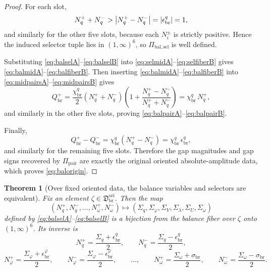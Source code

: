 \documentclass[11pt]{article}
\newcommand{\OriginSector}{\mathfrak D_{\mathrm{br}}^{\mathrm{ori}}}
\newcommand{\AbsReadAmp}{\chi_{\mathrm{br}}^{q}}
\newcommand{\PolRead}{\epsilon_{\mathrm{br}}^{q}}
\newcommand{\PolCov}{\epsilon_{\mathrm{br}}^{\varphi}}
\newcommand{\PolScale}{\sigma_{\mathrm{br}}}
\newcommand{\PairMap}{\Pi_{\mathrm{pair}}}
\newcommand{\PairReadPlus}{Q_{\mathrm{br}}^{+}}
\newcommand{\PairReadMinus}{Q_{\mathrm{br}}^{-}}
\newcommand{\SelRead}{\Sigma_{q}}
\newcommand{\SelCov}{\Sigma_{\varphi}}
\newcommand{\SelRelax}{\Sigma_{V}}
\newcommand{\SelWell}{\Sigma_{\lambda}}
\newcommand{\SelEq}{\Sigma_{U}}
\newcommand{\SelScale}{\Sigma_{\omega}}
\newcommand{\BalSelMap}{\Pi_{\mathrm{bal,sel}}}
\newcommand{\BalReadPlus}{N_{q}^{+}}
\newcommand{\BalReadMinus}{N_{q}^{-}}
\newcommand{\BalCovPlus}{N_{\varphi}^{+}}
\newcommand{\BalCovMinus}{N_{\varphi}^{-}}
\newcommand{\BalScalePlus}{N_{\omega}^{+}}
\newcommand{\BalScaleMinus}{N_{\omega}^{-}}
\newtheorem{theorem}{Theorem}
\begin{document}
\begin{proof}
For each slot,
\[
\BalReadPlus+\BalReadMinus
>
\abs{\BalReadPlus-\BalReadMinus}
=
\abs{\PolRead}
=
1,
\]
and similarly for the other five slots, because each \(N_i^{\pm}\) is strictly positive. Hence the induced selector tuple lies in \((1,\infty)^{6}\), so \(\BalSelMap\) is well defined.

Substituting \eqref{eq:balselA}--\eqref{eq:balselB} into \eqref{eq:selmidA}--\eqref{eq:selfiberB} gives \eqref{eq:balmidA}--\eqref{eq:balfiberB}. Then inserting \eqref{eq:balmidA}--\eqref{eq:balfiberB} into \eqref{eq:midpairsA}--\eqref{eq:midpairsB} gives
\[
\PairReadPlus
=
\frac{\AbsReadAmp}{2}(\BalReadPlus+\BalReadMinus)
\left(
1+\frac{\BalReadPlus-\BalReadMinus}{\BalReadPlus+\BalReadMinus}
\right)
=
\AbsReadAmp\,\BalReadPlus,
\]
and similarly in the other five slots, proving \eqref{eq:balpairA}--\eqref{eq:balpairB}.

Finally,
\[
\PairReadPlus-\PairReadMinus
=
\AbsReadAmp(\BalReadPlus-\BalReadMinus)
=
\AbsReadAmp\,\PolRead,
\]
and similarly for the remaining five slots. Therefore the gap magnitudes and gap signs recovered by \(\PairMap\) are exactly the original oriented absolute-amplitude data, which proves \eqref{eq:balorigin}.
\end{proof}

\begin{theorem}[Over fixed oriented data, the balance variables and selectors are equivalent]
\label{thm:balbijection}
Fix an element \(\zeta\in\OriginSector\). Then the map
\[
(\BalReadPlus,\BalReadMinus,\ldots,\BalScalePlus,\BalScaleMinus)
\longmapsto
(\SelRead,\SelCov,\SelRelax,\SelWell,\SelEq,\SelScale)
\]
defined by \eqref{eq:balselA}--\eqref{eq:balselB} is a bijection from the balance fiber over \(\zeta\) onto \((1,\infty)^{6}\). Its inverse is
\begin{equation}
\BalReadPlus=\frac{\SelRead+\PolRead}{2},
\qquad
\BalReadMinus=\frac{\SelRead-\PolRead}{2},
\label{eq:balinvA}
\end{equation}
\begin{equation}
\BalCovPlus=\frac{\SelCov+\PolCov}{2},
\qquad
\BalCovMinus=\frac{\SelCov-\PolCov}{2},
\qquad
\ldots,
\qquad
\BalScalePlus=\frac{\SelScale+\PolScale}{2},
\qquad
\BalScaleMinus=\frac{\SelScale-\PolScale}{2}.
\label{eq:balinvB}
\end{equation}
\end{theorem}
\end{document}
